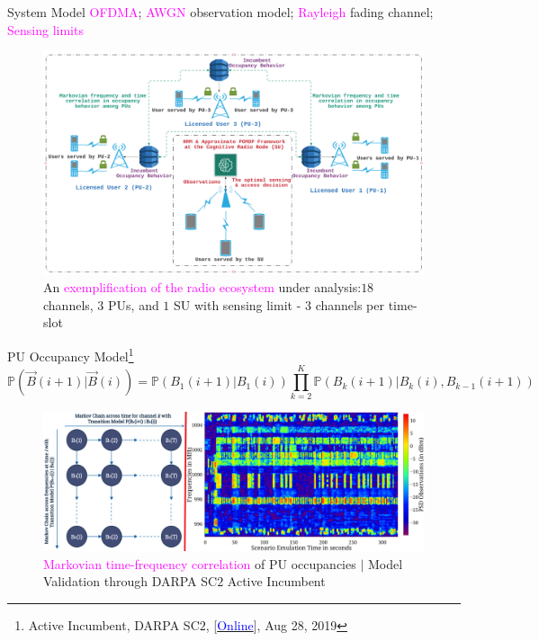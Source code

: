 \documentclass{beamer}
\begin{document}
\begin{frame}{System Model}
\footnotesize{\textcolor{magenta}{OFDMA}; \textcolor{magenta}{AWGN} observation model; \textcolor{magenta}{Rayleigh} fading channel; \textcolor{magenta}{Sensing limits}}
\begin{figure}
    \centering
    \includegraphics[width = 1.0\textwidth]{figs/System_Model_1.png}
    \caption{An \textcolor{magenta}{exemplification of the radio ecosystem} under analysis:\newline $18$ channels, $3$ PUs, and $1$ SU with sensing limit - $3$ channels per time-slot}
    \label{fig:2a}
\end{figure}
\end{frame}
\begin{frame}{PU Occupancy Model\footnote{\tiny{Active Incumbent, DARPA SC$2$, [\href{https://sc2colosseum.freshdesk.com/support/solutions/articles/22000239489-active-incumbent-}{\textcolor{blue}{Online}}], Aug 28, 2019}}}
\footnotesize{\[\mathbb{P}(\vec{B}(i+1)|\vec{B}(i))=\mathbb{P}(B_{1}(i+1)|B_{1}(i))\prod_{k=2}^{K}\mathbb{P}(B_{k}(i+1)|B_{k}(i), B_{k-1}(i+1))\]}
\begin{figure}
    \centering
    \includegraphics[width = 1.0\textwidth]{figs/Minerva_Markov_Chain_with_Aggregated_PSD_Observations.png}
    \caption{\textcolor{magenta}{Markovian time-frequency correlation} of PU occupancies $|$ Model Validation through DARPA SC$2$ Active Incumbent}
    \label{fig:2b}
\end{figure}
\end{frame}
\end{document}
